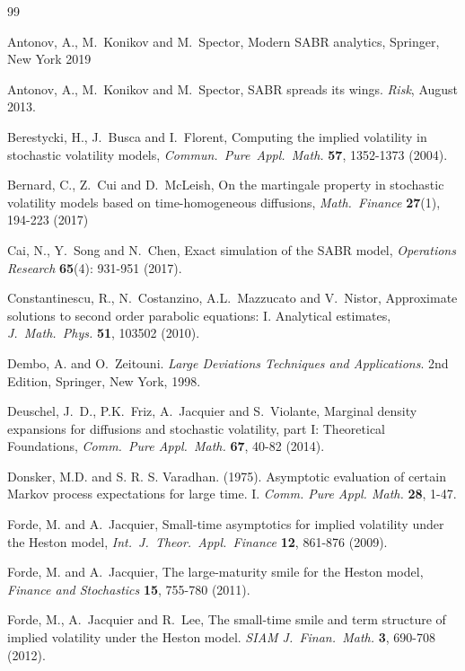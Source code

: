 \documentclass[11pt]{article}
\numberwithin{equation}{section}
\theoremstyle{plain}
\begin{document}
\begin{thebibliography}{99}

Antonov, A., M.~Konikov and M.~Spector, 
Modern SABR analytics,
Springer, New York 2019

Antonov, A., M.~Konikov and M.~Spector, 
SABR spreads its wings.
\textit{Risk}, August 2013.

Berestycki, H., J.~Busca and I.~Florent,
Computing the implied volatility in stochastic volatility models,
\textit{Commun.~Pure~Appl.~Math.} 
\textbf{57}, 1352-1373 (2004).

Bernard, C., Z.~Cui and D.~McLeish,
On the martingale property in stochastic volatility models based on 
time-homogeneous diffusions,
\textit{Math.~Finance} 
\textbf{27}(1), 194-223 (2017)

Cai, N., Y.~Song and N.~Chen,
Exact simulation of the SABR model,
\textit{Operations Research}
\textbf{65}(4): 931-951 (2017).

Constantinescu, R., N.~Costanzino, A.L.~Mazzucato and V.~Nistor,
Approximate solutions to second order parabolic equations:
I. Analytical estimates,
\textit{J.~Math.~Phys.} \textbf{51}, 103502 (2010).

Dembo, A. and O.~Zeitouni. 
\emph{Large Deviations Techniques and Applications}. 
2nd Edition, Springer, New York, 1998.

Deuschel, J.~D., P.K.~Friz, A.~Jacquier and S.~Violante,
Marginal density expansions for diffusions and stochastic volatility,
part I: Theoretical Foundations,
\textit{Comm.~Pure Appl.~Math.} 
\textbf{67}, 40-82 (2014).

Donsker, M.D. and S. R. S. Varadhan. (1975).
Asymptotic evaluation of certain Markov process expectations for large time. I.
\textit{Comm. Pure Appl. Math.}
\textbf{28}, 1-47.

Forde, M. and A.~Jacquier, 
Small-time asymptotics for implied volatility under the Heston model, 
\textit{Int.~J.~Theor.~Appl.~Finance} 
\textbf{12}, 861-876 (2009).

Forde, M. and A.~Jacquier, 
The large-maturity smile for the Heston model, 
\textit{Finance and Stochastics} 
\textbf{15}, 755-780 (2011).

Forde, M., A.~Jacquier and R.~Lee, 
The small-time smile and term structure of implied volatility under the
Heston model.
\textit{SIAM J.~Finan.~Math.}
\textbf{3}, 690-708 (2012).


\end{thebibliography}
\end{document}
